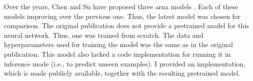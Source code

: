 
Over the years, Chen and Su have proposed three \gls{arna}
models \parencite{chen2018functional, chen2019harmony,
chen2021attend}. Each of these models improving over the
previous one. Thus, the latest model
\parencite{chen2021attend} was chosen for comparison. The
original publication does not provide a pretrained model for
this neural network. Thus, one was trained from scratch. The
data and hyperparameters used for training the model was the
same as in the original publication. This model also lacked
a code implementation for running it in inference mode
(i.e., to predict unseen examples). I provided an
implementation, which is made publicly available, together
with the resulting pretrained
model.
